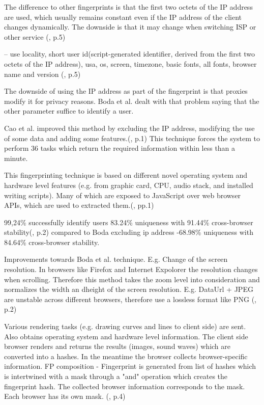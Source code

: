 The difference to other fingerprints is that the first two octets of the IP address are used, which usually remains constant even if the IP address of the client changes dynamically. The downside is that it may change when switching ISP or other service
(\textcite{boda11}, p.5)

-- use locality, short user id(script-generated identifier, derived from the first two octets of the IP address), usa, os, screen, timezone, basic fonts, all fonts, browser name and version
(\textcite{boda11}, p.5)

The downside of using the IP address as part of the fingerprint is that proxies modify it for privacy reasons. Boda et al. dealt with that problem saying that the other parameter suffice to identify a user.

Cao et al. improved this method by excluding the IP address, modifying the use of some data and adding some features.(\textcite{Cao17}, p.1) This technique forces the system to perform 36 tasks which return the required information within less than a minute.

This fingerprinting technique is based on different novel operating system and hardware level features (e.g. from graphic card, CPU, audio stack, and installed writing scripts). Many of which are exposed to JavaScript over web browser APIs, which are used to extracted them.(\textcite{Cao17}, pp.1)

99,24\%  successfully identify users 
83.24\% uniqueness with 91.44\% cross-browser stability(\textcite{Cao17}, p.2)
compared to Boda excluding ip address -68.98\% uniqueness with 84.64\% cross-browser stability.

Improvements towards Boda et al. technique. 
E.g. Change of the screen resolution. In browsers like Firefox and Internet Expolorer the resolution changes when scrolling. Therefore this method takes the zoom level into consideration and normalizes the width an dheight of the screen resolution.
E.g. DataUrl + JPEG are unstable across different browsers, therefore use a lossless format like PNG 
(\textcite{Cao17}, p.2)

Various rendering tasks (e.g. drawing curves and lines to client side) are sent. Also obtains operating system and hardware level information. The client side browser renders and returns the results (images, sound waves) which are converted into a hashes. In the meantime the browser collects browser-specific information.
FP composition - Fingerprint is generated from list of hashes which is intertwined with a mask through a "and" operation which creates the fingerprint hash.
The collected browser information corresponds to the mask. Each browser has its own mask. (\textcite{Cao17}, p.4)

